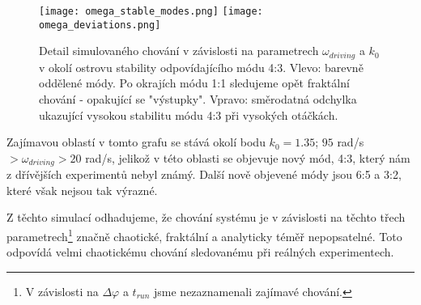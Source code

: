 \begin{figure}[H]
    \texttt{[image: omega\_stable\_modes.png]}
    \texttt{[image: omega\_deviations.png]}
    \centering
    \caption[Detail simulovaného chování v závislosti na parametrech $\omega_{driving}$ a $k_0$ v okolí ostrovu stability odpovídajícího módu 4:3.]{Detail simulovaného chování v závislosti na parametrech $\omega_{driving}$ a $k_0$ v okolí ostrovu stability odpovídajícího módu 4:3. Vlevo: barevně oddělené módy. Po okrajích módu 1:1 sledujeme opět fraktální chování - opakující se "výstupky". Vpravo: směrodatná odchylka ukazující vysokou stabilitu módu 4:3 při vysokých otáčkách.}
    \label{fig:state_graph_omega}
\end{figure}

Zajímavou oblastí v tomto grafu se stává okolí bodu $k_0=1.35$; $95$ rad/s $ > \omega_{driving} > 20$ rad/s, jelikož v této oblasti se objevuje nový mód, 4:3, který nám z dřívějších experimentů nebyl známý.
Další nově objevené módy jsou 6:5 a 3:2, které však nejsou tak výrazné.

Z těchto simulací odhadujeme, že chování systému je v závislosti na těchto třech parametrech\footnote{V závislosti na $\Delta \varphi$ a $t_{run}$ jsme nezaznamenali zajímavé chování.} značně chaotické, fraktální a analyticky téměř nepopsatelné. Toto odpovídá velmi chaotickému chování sledovanému při reálných experimentech.